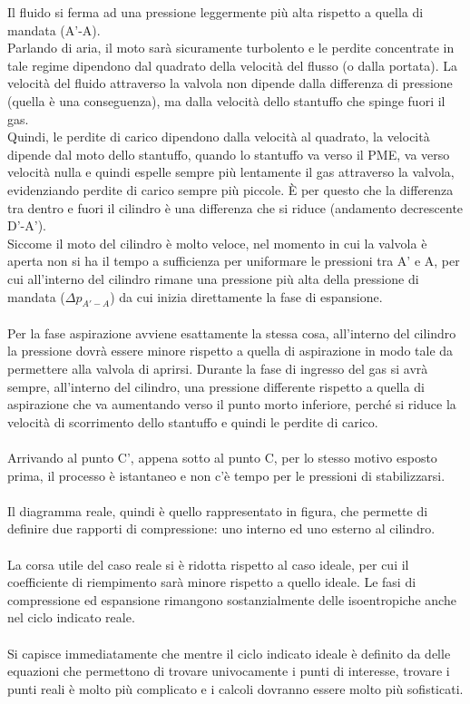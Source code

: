 Il fluido si ferma ad una pressione leggermente più alta rispetto a quella di mandata (A’-A).\\ Parlando di aria, il moto sarà sicuramente turbolento e le perdite concentrate in tale regime dipendono dal quadrato della velocità del flusso (o dalla portata). La velocità del fluido attraverso la valvola non dipende dalla differenza di pressione (quella è una conseguenza), ma dalla velocità dello stantuffo che spinge fuori il gas.\\
Quindi, le perdite di carico dipendono dalla velocità al quadrato, la velocità dipende dal moto dello stantuffo, quando lo stantuffo va verso il PME, va verso velocità nulla e quindi espelle sempre più lentamente il gas attraverso la valvola, evidenziando perdite di carico sempre più piccole. È per questo che la differenza tra dentro e fuori il cilindro è una differenza che si riduce (andamento decrescente D’-A’). \\
Siccome il  moto del cilindro è molto veloce, nel momento in cui la valvola è aperta non si ha il tempo a sufficienza per uniformare le pressioni tra A’ e A, per cui all’interno del cilindro rimane una pressione più alta della pressione di mandata ($\Delta p_{A'-A}$) da cui inizia direttamente la fase di espansione. \\
\\
Per la fase aspirazione avviene esattamente la stessa cosa, all’interno del cilindro la pressione dovrà essere minore rispetto a quella di aspirazione in modo tale da permettere alla valvola di aprirsi. Durante la fase di ingresso del gas si avrà sempre, all’interno del cilindro, una pressione differente rispetto a quella di aspirazione che va aumentando verso il punto morto inferiore, perché si riduce la velocità di scorrimento dello stantuffo e quindi le perdite di carico. \\
\\
Arrivando al punto C’, appena sotto al punto C, per lo stesso motivo esposto prima, il processo è istantaneo e non c’è tempo per le pressioni di stabilizzarsi. \\
\\
Il diagramma reale, quindi è quello rappresentato in figura, che permette di definire due rapporti di compressione: uno interno ed uno esterno al cilindro.\\
\\
La corsa utile del caso reale si è ridotta rispetto al caso ideale, per cui il coefficiente di riempimento sarà minore rispetto a quello ideale. Le fasi di compressione ed espansione rimangono sostanzialmente delle isoentropiche anche nel ciclo indicato reale. \\
\\
Si capisce immediatamente che mentre il ciclo indicato ideale è definito da delle equazioni che permettono di trovare univocamente i punti di interesse, trovare i punti reali è molto più complicato e i calcoli dovranno essere molto più sofisticati. 
